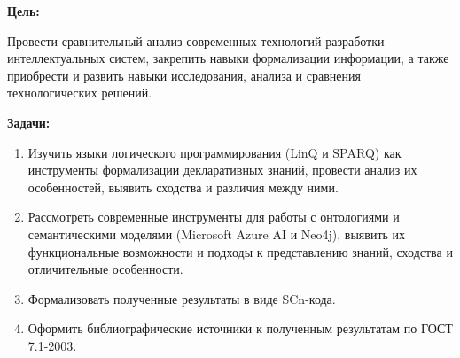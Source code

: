 
\textbf{Цель:}

Провести сравнительный анализ современных технологий разработки интеллектуальных систем, закрепить навыки формализации информации, а также приобрести и развить навыки исследования, анализа и сравнения технологических решений.

\bigskip

\textbf{Задачи:}

\begin{enumerate}
    \item Изучить языки логического программирования (LinQ и SPARQ) как инструменты формализации декларативных знаний, провести анализ их особенностей, выявить сходства и различия между ними.
    \item Рассмотреть современные инструменты для работы с онтологиями и семантическими моделями (Microsoft Azure AI и Neo4j), выявить их функциональные возможности и подходы к представлению знаний, сходства и отличительные особенности.
    \item Формализовать полученные результаты в виде SCn-кода.
    \item Оформить библиографические источники к полученным результатам по ГОСТ 7.1-2003.
\end{enumerate}
